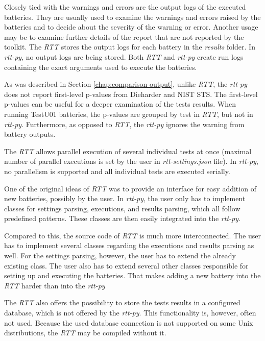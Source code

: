 \documentclass[
  digital,     %
  oneside,     %
  nosansbold,  %
  nocolorbold, %
  nolof,         %
  nolot,         %
]{fithesis4}
\begin{document}
Closely tied with the warnings and errors are the output logs of the executed batteries. They are usually used to examine the warnings and errors raised by the batteries and to decide about the severity of the warning or error. Another usage may be to examine further details of the report that are not reported by the toolkit. The \emph{RTT} stores the output logs for each battery in the \emph{results} folder. In \emph{rtt-py}, no output logs are being stored. Both \emph{RTT} and \emph{rtt-py} create run logs containing the exact arguments used to execute the batteries.

As was described in Section \ref{chap:comparison-output}, unlike \emph{RTT}, the \emph{rtt-py} does not report first-level p-values from Dieharder and NIST STS. The first-level p-values can be useful for a deeper examination of the tests results. When running TestU01 batteries, the p-values are grouped by test in \emph{RTT}, but not in \emph{rtt-py}. Furthermore, as opposed to \emph{RTT}, the \emph{rtt-py} ignores the warning from battery outputs.


The \emph{RTT} allows parallel execution of several individual tests at once (maximal number of parallel executions is set by the user in \emph{rtt-settings.json} file). In \emph{rtt-py}, no parallelism is supported and all individual tests are executed serially. 

One of the original ideas of \emph{RTT} was to provide an interface for easy addition of new batteries, possibly by the user. In \emph{rtt-py}, the user only has to implement classes for settings parsing, executions, and results parsing, which all follow predefined patterns. These classes are then easily integrated into the \emph{rtt-py}.

Compared to this, the source code of \emph{RTT} is much more interconnected. The user has to implement several classes regarding the executions and results parsing as well. For the settings parsing, however, the user has to extend the already existing class. The user also has to extend several other classes responsible for setting up and executing the batteries. That makes adding a new battery into the \emph{RTT} harder than into the \emph{rtt-py}

The \emph{RTT} also offers the possibility to store the tests results in a configured database, which is not offered by the \emph{rtt-py}. This functionality is, however, often not used. Because the used database connection is not supported on some Unix distributions, the \emph{RTT} may be compiled without it.
\end{document}
